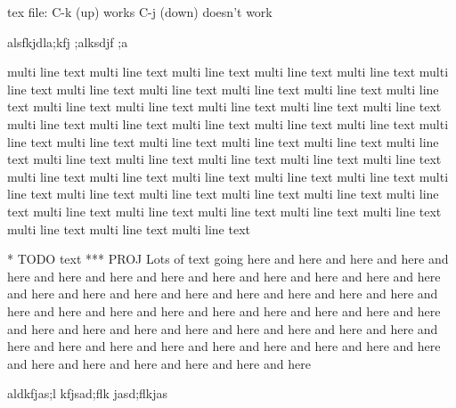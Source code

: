 

tex file:
  C-k (up)   works
  C-j (down) doesn't work

alsfkjdla;kfj ;alksdjf ;a



multi line text multi line text multi line text multi line text multi line text multi line text multi line text multi line text multi line text multi line text multi line text multi line text multi line text multi line text multi line text multi line text multi line text multi line text multi line text multi line text multi line text multi line text multi line text multi line text multi line text multi line text multi line text multi line text multi line text multi line text multi line text multi line text multi line text multi line text multi line text multi line text multi line text multi line text multi line text multi line text multi line text multi line text multi line text multi line text multi line text multi line text multi line text multi line text multi line text multi line text multi line text 


* TODO text
*** PROJ Lots of text going here and here and here and here and here and here and here and here and here and here and here and here and here and here and here and here and here and here and here and here and here and here and here and here and here and here and here and here and here and here and here and here and here and here and here and here and here and here and here and here and here and here and here and here and here and here and here and here and here and here and here and here and here 



aldkfjas;l kfjsad;flk jasd;flkjas 

